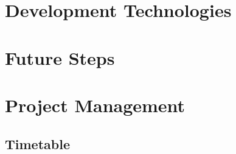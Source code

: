 \documentclass[12pt, a4paper, twoside, onecolumn]{article}
\begin{document}
\section{Development Technologies}


\section{Future Steps}

\section{Project Management}
\label{project_management}
\subsection{Timetable}
\label{timetable}
\end{document}
